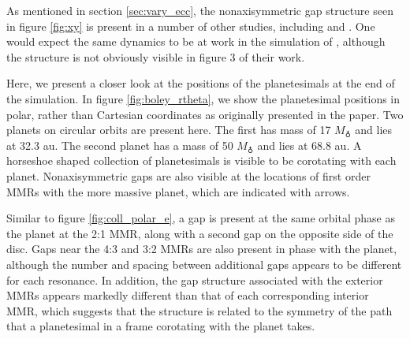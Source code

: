 \documentclass[fleqn,usenatbib]{mnras}
\begin{document}
As mentioned in section \ref{sec:vary_ecc}, the nonaxisymmetric gap structure seen in figure \ref{fig:xy} is present in a number of other studies,
including \citet{2000Icar..143...45R} and \citet{2016ApJ...818..159T}. One would expect the same dynamics to be at work in the simulation of 
\citet{2017ApJ...850..103B}, although the structure is not obviously visible in figure 3 of their work.

Here, we present a closer look at the positions of the planetesimals at the end of the \citet{2017ApJ...850..103B} simulation. In figure 
\ref{fig:boley_rtheta}, we show the planetesimal positions in polar, rather than Cartesian coordinates as originally presented in the paper. Two planets 
on circular orbits are present here. The first has mass of 17 $M_{\earth}$ and lies at 32.3 au. The second planet has a mass of 50 $M_{\earth}$ 
and lies at 68.8 au. A horseshoe shaped collection of planetesimals is visible to be corotating with each planet. Nonaxisymmetric gaps are also
visible at the locations of first order MMRs with the more massive planet, which are indicated with arrows.

Similar to figure \ref{fig:coll_polar_e}, a gap is present at the same orbital phase as the planet at the 2:1 MMR, along with a second gap on
the opposite side of the disc. Gaps near the 4:3 and 3:2 MMRs are also present in phase with the planet, although the number and spacing between 
additional gaps appears to be different for each resonance. In addition, the gap structure associated with the exterior MMRs appears markedly
different than that of each corresponding interior MMR, which suggests that the structure is related to the symmetry of the path that a planetesimal
in a frame corotating with the planet takes.

\bsp	%
\label{lastpage}
\end{document}
